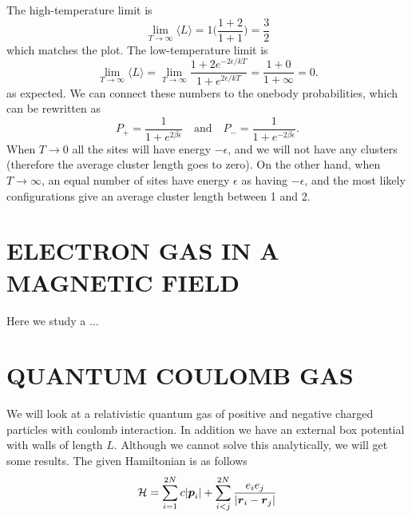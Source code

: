\documentclass[norsk,a4paper,12pt]{article}
\begin{document}
The high-temperature limit is
\begin{equation}
\lim_{T\rightarrow\infty}\langle L\rangle = 1\bigg(\frac{1+2}{1+1}\bigg)=\frac{3}{2}
\end{equation}
which matches the plot. The low-temperature limit is
\begin{equation}
\lim_{T\rightarrow\infty}\langle L\rangle = \lim_{T\rightarrow\infty} \frac{1+2e^{-2\epsilon/kT}}{1+e^{2\epsilon/kT}}=\frac{1+0}{1+\infty}=0.
\end{equation}
as expected. We can connect these numbers to the onebody probabilities, which can be rewritten as
\begin{equation}
P_+=\frac{1}{1+e^{2\beta\epsilon}}\quad\text{and}\quad P_-=\frac{1}{1+e^{-2\beta\epsilon}}.
\end{equation}
When $T\rightarrow 0$ all the sites will have energy $-\epsilon$, and we will not have any clusters (therefore the average cluster length goes to zero). On the other hand, when $T\rightarrow\infty$, an equal number of sites have energy $\epsilon$ as having $-\epsilon$, and the most likely configurations give an average cluster length between 1 and 2.

\newpage
\section{ELECTRON GAS IN A MAGNETIC FIELD}
Here we study a ...

\subsection{}

\newpage
\section{QUANTUM COULOMB GAS}
We will look at a relativistic quantum gas of positive and negative charged particles with coulomb interaction. In addition we have an external box potential with walls of length $L$. Although we cannot solve this analytically, we will get some results. The given Hamiltonian is as follows
\begin{equation}
{\cal H}=\sum_{i=1}^{2N}c|\boldsymbol{p}_i|+\sum_{i<j}^{2N}\frac{e_ie_j}{|\boldsymbol{r}_i - \boldsymbol{r}_j|}
\end{equation}
\end{document}
